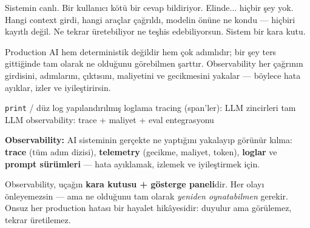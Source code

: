 

Sistemin canlı. Bir kullanıcı kötü bir cevap bildiriyor. Elinde... hiçbir şey
yok. Hangi context girdi, hangi araçlar çağrıldı, modelin önüne ne kondu ---
hiçbiri kayıtlı değil. Ne tekrar üretebiliyor ne teşhis edebiliyorsun. Sistem
bir kara kutu.


Production AI hem deterministik değildir hem çok adımlıdır; bir şey ters
gittiğinde tam olarak ne olduğunu görebilmen şarttır. Observability her çağrının
girdisini, adımlarını, çıktısını, maliyetini ve gecikmesini yakalar --- böylece
hata ayıklar, izler ve iyileştirirsin.

\begin{timeline}
 \texttt{print} / düz log \tlsep {} yapılandırılmış loglama \tlsep {} tracing (span'ler): LLM zincirleri \tlsep {} tam LLM observability: trace + maliyet + eval entegrasyonu
\end{timeline}

\begin{problembox}
\textbf{Observability:} AI sisteminin gerçekte ne yaptığını yakalayıp görünür
kılma: \textbf{trace} (tüm adım dizisi), \textbf{telemetry} (gecikme, maliyet,
token), \textbf{loglar} ve \textbf{prompt sürümleri} --- hata ayıklamak, izlemek
ve iyileştirmek için.
\end{problembox}

\begin{mentalbox}
Observability, uçağın \textbf{kara kutusu + gösterge paneli}dir. Her olayı
önleyemezsin --- ama ne olduğunu tam olarak \emph{yeniden oynatabilmen} gerekir.
Onsuz her production hatası bir hayalet hikâyesidir: duyulur ama görülemez,
tekrar üretilemez.
\end{mentalbox}

